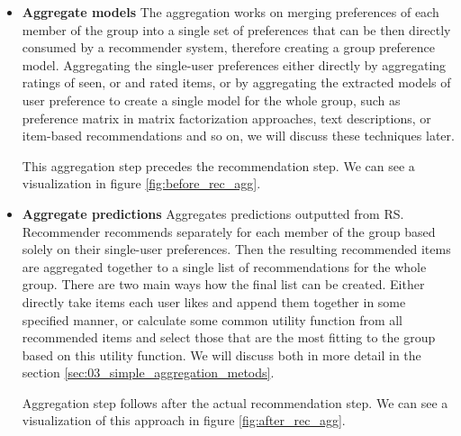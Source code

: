 \begin{itemize}
    \item \textbf{Aggregate models} \newline
    The aggregation works on merging preferences of each member of the group into a single set of preferences that can be then directly consumed by a recommender system, therefore creating a group preference model. Aggregating the single-user preferences either directly by aggregating ratings of seen, or and rated items, or by aggregating the extracted models of user preference to create a single model for the whole group, such as preference matrix in matrix factorization approaches, text descriptions, or item-based recommendations and so on, we will discuss these techniques later.
    
    
    This aggregation step precedes the recommendation step. We can see a visualization in figure \ref{fig:before_rec_agg}.
    
    
    \item \textbf{Aggregate predictions} \newline
     Aggregates predictions outputted from RS. Recommender recommends separately for each member of the group based solely on their single-user preferences. Then the resulting recommended items are aggregated together to a single list of recommendations for the whole group. There are two main ways how the final list can be created. Either directly take items each user likes and append them together in some specified manner, or calculate some common utility function from all recommended items and select those that are the most fitting to the group based on this utility function. We will discuss both in more detail in the section \ref{sec:03_simple_aggregation_metods}.
     
     Aggregation step follows after the actual recommendation step. We can see a visualization of this approach in figure \ref{fig:after_rec_agg}.
     

\end{itemize}
